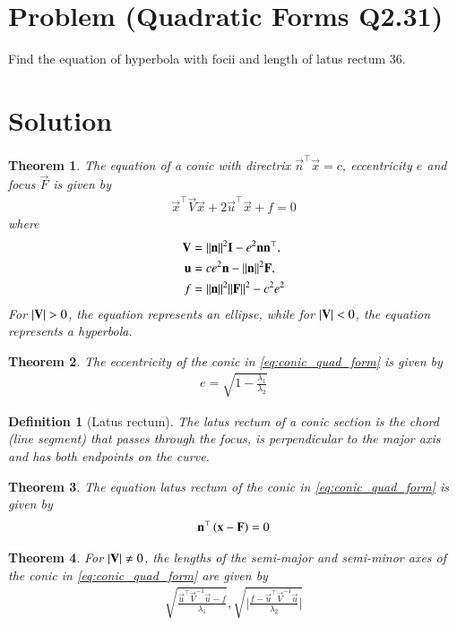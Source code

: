 \documentclass[journal,12pt,twocolumn]{IEEEtran}
\newtheorem{theorem}{Theorem}[section]
\newtheorem{definition}{Definition}[section]
\begin{document}
\section{Problem (Quadratic Forms Q2.31)}
Find the equation of hyperbola with focii  and length of latus rectum 36.
\section{Solution}
\begin{theorem}
The equation of a conic with directrix $\vec{n}^{\top}\vec{x} = c$, eccentricity $e$ and focus $\vec{F}$ is given by 
\begin{align}
    \label{eq:conic_quad_form}
    \vec{x}^{\top}\vec{V}\vec{x}+2\vec{u}^{\top}\vec{x}+f=0
    \end{align}
where     
\begin{align}
\label{eq:conic_quad_form_v}
\mathbf{V} &=\lVert\mathbf{n}\rVert^2\mathbf{I}-e^2\mathbf{n}\mathbf{n}^{\top}, \\
\label{eq:conic_quad_form_u}
\mathbf{u} &= ce^2\mathbf{n}-\lVert\mathbf{n}\rVert^2\mathbf{F}, \\
\label{eq:conic_quad_form_f}
f &= \lVert\mathbf{n}\rVert^2\lVert\mathbf{F}\rVert^2-c^2e^2
\end{align}
For $\vert\mathbf{V}\vert>0$, the equation represents an ellipse, while for $\vert\mathbf{V}\vert<0$, the equation represents a hyperbola.
\end{theorem}
\begin{theorem}
The eccentricity of the conic in \eqref{eq:conic_quad_form} is given by
\begin{align}
e= \sqrt{1-\frac{\lambda_1}{\lambda_2}}
\label{eq:e}
\end{align}
\end{theorem}
\begin{definition}[Latus rectum]
The latus rectum of a conic section is the chord (line segment) that passes through the focus, is perpendicular to the major axis and has both endpoints on the curve.
\end{definition}
\begin{theorem}
The equation latus rectum of the conic in \eqref{eq:conic_quad_form} is given by
\begin{align}
    \mathbf{n}^{\top}\left(\mathbf{x}-\mathbf{F}\right) = 0
    \label{eq:lreq}
\end{align}
\end{theorem}
\begin{theorem}
For $\vert\mathbf{V}\vert \ne 0$, the lengths of the semi-major and semi-minor axes of the conic in \eqref{eq:conic_quad_form} are given by 
\begin{align} 
\sqrt{\frac{\vec{u}^{\top}\vec{V}^{-1}\vec{u} -f}{\lambda_1}}, 
\sqrt{\bigg | \frac{f-\vec{u}^{\top}\vec{V}^{-1}\vec{u}}{\lambda_2}\bigg | }
\label{eq:ab}
\end{align} 
\end{theorem}
\end{document}
